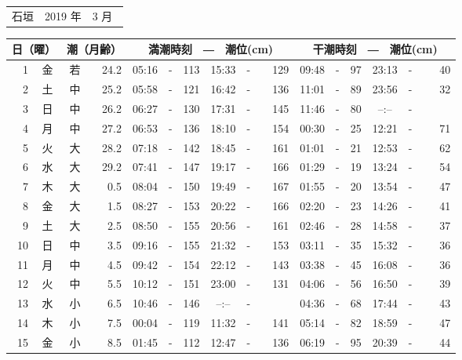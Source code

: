 \documentclass[12pt,a4j]{jsarticle}
\begin{document}
 \begin{table}[htbp]
 \begin{tabular}{lcc}
 {\LARGE 石垣 } & {\large 2019 年} & {\large  3 月}\
 \end{tabular}
 \begin{center}
    \begin{tabular}{|rc|cr|ccrccr|ccrccr|}
    \hline
    \multicolumn{2}{|c|}{日（曜）} & \multicolumn{2}{c|}{潮（月齢）} & \multicolumn{6}{c|}{満潮時刻　―　潮位(cm)} & \multicolumn{6}{c|}{干潮時刻　―　潮位(cm)} \\
 \hline
 1 & 金 & 若 & 24.2 &  05:16 &-& 113  &  15:33 &-& 129  &   09:48 &-&  97  &   23:13 &-&  40  \\
 2 & 土 & 中 & 25.2 &  05:58 &-& 121  &  16:42 &-& 136  &   11:01 &-&  89  &   23:56 &-&  32  \\
 3 & 日 & 中 & 26.2 &  06:27 &-& 130  &  17:31 &-& 145  &   11:46 &-&  80  &   --:-- &-&~~~~~ \\
 4 & 月 & 中 & 27.2 &  06:53 &-& 136  &  18:10 &-& 154  &   00:30 &-&  25  &   12:21 &-&  71  \\
 5 & 火 & 大 & 28.2 &  07:18 &-& 142  &  18:45 &-& 161  &   01:01 &-&  21  &   12:53 &-&  62  \\
 6 & 水 & 大 & 29.2 &  07:41 &-& 147  &  19:17 &-& 166  &   01:29 &-&  19  &   13:24 &-&  54  \\
 7 & 木 & 大 &  0.5 &  08:04 &-& 150  &  19:49 &-& 167  &   01:55 &-&  20  &   13:54 &-&  47  \\
 8 & 金 & 大 &  1.5 &  08:27 &-& 153  &  20:22 &-& 166  &   02:20 &-&  23  &   14:26 &-&  41  \\
 9 & 土 & 大 &  2.5 &  08:50 &-& 155  &  20:56 &-& 161  &   02:46 &-&  28  &   14:58 &-&  37  \\
10 & 日 & 中 &  3.5 &  09:16 &-& 155  &  21:32 &-& 153  &   03:11 &-&  35  &   15:32 &-&  36  \\
11 & 月 & 中 &  4.5 &  09:42 &-& 154  &  22:12 &-& 143  &   03:38 &-&  45  &   16:08 &-&  36  \\
12 & 火 & 中 &  5.5 &  10:12 &-& 151  &  23:00 &-& 131  &   04:06 &-&  56  &   16:50 &-&  39  \\
13 & 水 & 小 &  6.5 &  10:46 &-& 146  &  --:-- &-&~~~~~ &   04:36 &-&  68  &   17:44 &-&  43  \\
14 & 木 & 小 &  7.5 &  00:04 &-& 119  &  11:32 &-& 141  &   05:14 &-&  82  &   18:59 &-&  47  \\
15 & 金 & 小 &  8.5 &  01:45 &-& 112  &  12:47 &-& 136  &   06:19 &-&  95  &   20:39 &-&  44  \\

\end{tabular}
\end{center}
\end{table}
\end{document}
